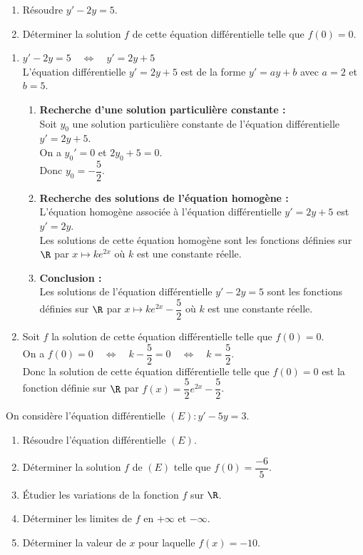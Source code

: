\documentclass[a4paper,11pt,exos]{nsi} %
\begin{document}
\exo{}
\begin{enumerate}
    \item Résoudre $y'-2y=5$.
    \item Déterminer la solution $f$ de cette équation différentielle telle que $f(0)=0$.
\end{enumerate}

\textcolor{UGLiBlue}{
    \begin{enumerate}
        \item $y'-2y=5 \quad \iff \quad y'=2y+5$\\
        L'équation différentielle $y'=2y+5$ est de la forme $y'=ay+b$ avec $a=2$ et $b=5$.
        \begin{enumerate}[label=\textbullet]
            \item \textbf{Recherche d'une solution particulière constante :}\\
            Soit $y_0$ une solution particulière constante de l'équation différentielle $y'=2y+5$.\\
            On a $y_0'=0$ et $2y_0+5=0$.\\
            Donc $y_0=-\dfrac{5}{2}$.
            \item \textbf{Recherche des solutions de l'équation homogène :}\\
            L'équation homogène associée à l'équation différentielle $y'=2y+5$ est $y'=2y$.\\
            Les solutions de cette équation homogène sont les fonctions définies sur $\R$ par $x\mapsto ke^{2x}$ où $k$ est une constante réelle.
            \item \textbf{Conclusion :}\\
            Les solutions de l'équation différentielle $y'-2y=5$ sont les fonctions définies sur $\R$ par $x\mapsto ke^{2x}- \dfrac{5}{2}$ où $k$ est une constante réelle.
            \end{enumerate}
        \item Soit $f$ la solution de cette équation différentielle telle que $f(0)=0$.\\
        On a $f(0)=0 \quad \iff \quad k-\dfrac{5}{2}=0 \quad \iff \quad k=\dfrac{5}{2}$.\\
        Donc la solution de cette équation différentielle telle que $f(0)=0$ est la fonction définie sur $\R$ par $f(x)=\dfrac{5}{2}e^{2x}- \dfrac{5}{2}$.
    \end{enumerate}
}

\exo{}
On considère l'équation différentielle $(E) : y'-5y=3$.
\begin{enumerate}
    \item Résoudre l'équation différentielle $(E)$.
    \item Déterminer la solution $f$ de $(E)$ telle que $f(0)=\dfrac{-6}{5}$.
    \item Étudier les variations de la fonction $f$ sur $\R$.
    \item Déterminer les limites de $f$ en $+\infty$ et $-\infty$.
    \item Déterminer la valeur de $x$ pour laquelle $f(x)=-10$.
\end{enumerate}
\end{document}
